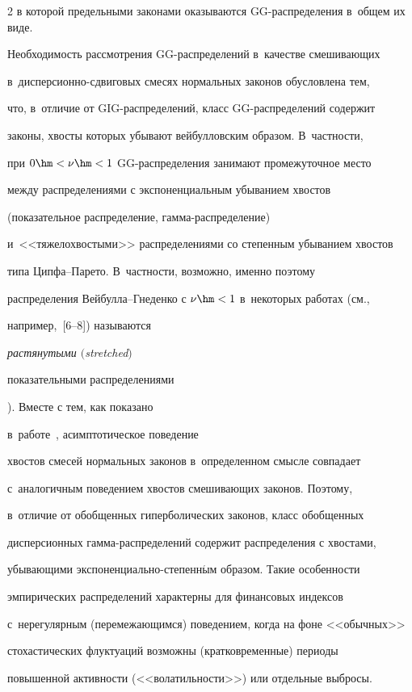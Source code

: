 \begin{multicols}{2}
в которой предельными законами оказываются GG-рас\-пре\-де\-ле\-ния в~общем их виде.





Необходимость рассмотрения GG-рас\-пре\-де\-ле\-ний в~качестве смешивающих 


в~дис\-пер\-си\-он\-но-сдви\-го\-вых смесях нормальных законов обусловлена тем,


что, в~отличие от GIG-рас\-пре\-де\-ле\-ний, класс GG-рас\-пре\-де\-ле\-ний содержит


законы, хвосты которых убывают вейбулловским образом. В~частности,


при $0\hm<\nu\hm<1$ GG-рас\-пре\-де\-ле\-ния за\-ни\-ма\-ют промежуточное место


между распределениями с экспоненциальным убыванием хвостов


(показательное распределение, гам\-ма-рас\-пре\-де\-ле\-ние) 


и~<<тяжелохвостыми>> распределениями со степенным убыванием хвостов


типа Цип\-фа--Па\-ре\-то. В~част\-ности, возможно, именно поэтому


распределения Вей\-бул\-ла--Гне\-ден\-ко с $\nu\hm<1$ в~некоторых работах (см.,


например,~[6--8]) называются {\it растянутыми $($stretched$)$


показательными распределениями}). Вместе с тем, как показано 


в~работе~\cite{AntonovKoksharov2006}, асимптотическое поведение


хвостов смесей нормальных законов в~определенном смысле совпадает 


с~аналогичным поведением хвостов смешивающих законов. Поэтому, 


в~отличие от обобщенных гиперболических законов, класс обобщенных


дисперсионных гам\-ма-рас\-пре\-де\-ле\-ний содержит распределения с хвостами,


убывающими экс\-по\-нен\-ци\-аль\-но-сте\-пен\-н$\acute{\mbox{ы}}$м образом. Такие особенности


эмпирических распределений характерны для финансовых индексов 


с~нерегулярным (перемежающимся) поведением, когда на фоне <<обычных>>


стохастических флуктуаций возможны (кратковременные) периоды


повышенной активности (<<волатильности>>) или отдельные выбросы.






\end{multicols}
